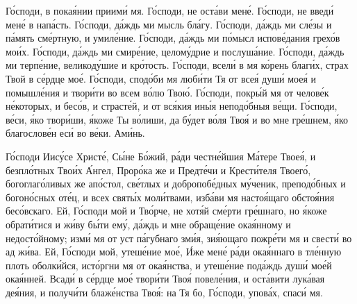 \begin{mymulticols}
Г\'{о}споди, в пока\'{я}нии приим\'{и} мя.
Г\'{о}споди, не ост\'{а}ви мен\'{е}.
Г\'{о}споди, не введ\'{и} мен\'{е} в нап\'{а}сть.
Г\'{о}споди, д\'{а}ждь ми мысль бл\'{а}гу.
Г\'{о}споди, д\'{а}ждь ми сл\'{е}зы и п\'{а}мять см\'{е}ртную, и умил\'{е}ние.
Г\'{о}споди, д\'{а}ждь ми п\'{о}мысл испов\'{е}дания грех\'{о}в мо\'{и}х.
Г\'{о}споди, д\'{а}ждь ми смир\'{е}ние, целом\'{у}дрие и послуш\'{а}ние.
Г\'{о}споди, д\'{а}ждь ми терп\'{е}ние, великод\'{у}шие и кр\'{о}тость.
Г\'{о}споди, всел\'{и} в мя к\'{о}рень благ\'{и}х, страх Твой в с\'{е}рдце мо\'{е}.
Г\'{о}споди, спод\'{о}би мя люб\'{и}ти Тя от все\'{я} душ\'{и} мое\'{я} и помышл\'{е}ния и твор\'{и}ти во всем в\'{о}лю Тво\'{ю}.
Г\'{о}споди, покр\'{ы}й мя от челов\'{е}к н\'{е}которых, и бес\'{о}в, и страст\'{е}й, и от вс\'{я}кия ин\'{ы}я непод\'{о}бныя в\'{е}щи.
Г\'{о}споди, в\'{е}си, \'{я}ко твор\'{и}ши, \'{я}коже Ты в\'{о}лиши, да б\'{у}дет в\'{о}ля Тво\'{я} и во мне гр\'{е}шнем, \'{я}ко благослов\'{е}н ес\'{и} во в\'{е}ки. Ам\'{и}нь.


Г\'{о}споди Иис\'{у}се Христ\'{е}, С\'{ы}не Б\'{о}жий, р\'{а}ди честн\'{е}йшия М\'{а}тере Твое\'{я}, и безпл\'{о}тных Тво\'{и}х \'{А}нгел, Прор\'{о}ка же и Предт\'{е}чи и Крест\'{и}теля Твоег\'{о}, богоглаг\'{о}ливых же ап\'{о}стол, св\'{е}тлых и добропоб\'{е}дных м\'{у}ченик, препод\'{о}бных и богон\'{о}сных от\'{е}ц, и всех свят\'{ы}х мол\'{и}твами, изб\'{а}ви мя насто\'{я}щаго обсто\'{я}ния бес\'{о}вскаго. Ей, Г\'{о}споди мой и Тв\'{о}рче, не хот\'{я}й см\'{е}рти гр\'{е}шнаго, но \'{я}коже обрат\'{и}тися и ж\'{и}ву б\'{ы}ти ем\'{у}, д\'{а}ждь и мне обращ\'{е}ние ока\'{я}нному и недост\'{о}йному; изм\'{и} мя от уст п\'{а}губнаго зм\'{и}я, зи\'{я}ющаго пожр\'{е}ти мя и свест\'{и} во ад ж\'{и}ва. Ей, Г\'{о}споди мой, утеш\'{е}ние мо\'{е}, \'{И}же мен\'{е} р\'{а}ди ока\'{я}ннаго в тл\'{е}нную плоть оболк\'{и}йся, ист\'{о}ргни мя от ока\'{я}нства, и утеш\'{е}ние под\'{а}ждь душ\'{и} мо\'{е}й ока\'{я}нней. Всад\'{и} в с\'{е}рдце мо\'{е} твор\'{и}ти Тво\'{я} повел\'{е}ния, и ост\'{а}вити лук\'{а}вая де\'{я}ния, и получ\'{и}ти блаж\'{е}нства Тво\'{я}: на Тя бо, Г\'{о}споди, упов\'{а}х, спас\'{и} мя.



\end{mymulticols}
